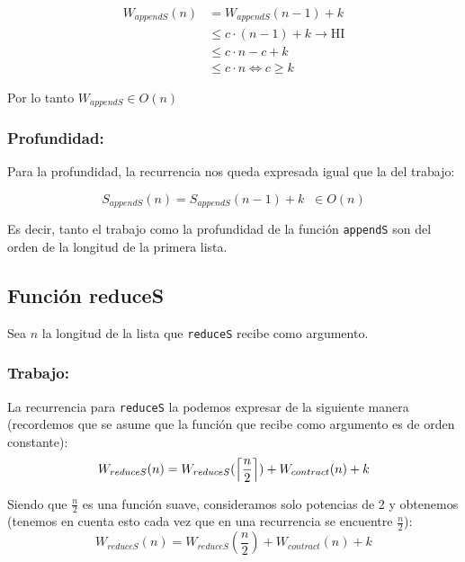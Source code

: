 \documentclass[11pt]{article}
\DeclarePairedDelimiter{\ceil}{\lceil}{\rceil}
\begin{document}
\begin{align*}
    W_{appendS}(n) & = W_{appendS}(n - 1) + k \\
             & \leq c \cdot (n - 1) + k \rightarrow \text{HI}\\
             & \leq c \cdot n - c + k \\
             & \leq c \cdot n \iff c \geq k
\end{align*}

Por lo tanto $W_{appendS} \in O(n)$ \\

\subsubsection{Profundidad:}

Para la profundidad, la recurrencia nos queda expresada igual que la del
trabajo:

\begin{equation*}
    S_{appendS}(n) = S_{appendS}(n - 1) + k \; \; \in O(n)
\end{equation*}

Es decir, tanto el trabajo como la profundidad de la función \texttt{appendS}
son del orden de la longitud de la primera lista.


\subsection{Función reduceS}
Sea $n$ la longitud de la lista que \texttt{reduceS} recibe como argumento.
\subsubsection{Trabajo:}

La recurrencia para \texttt{reduceS} la podemos expresar de la siguiente manera
(recordemos que se asume que la función que recibe como argumento es de orden constante):
\begin{equation*}
    W_{reduceS}(n) = W_{reduceS}(\ceil*{\frac{n}{2}}) + W_{contract}(n) + k
\end{equation*}

Siendo que $\frac{n}{2}$ es una función suave, consideramos solo potencias de 2
y obtenemos (tenemos en cuenta esto cada vez que en una recurrencia se encuentre
$\frac{n}{2}$):
\begin{equation*}
    W_{reduceS}(n) = W_{reduceS}(\frac{n}{2}) + W_{contract}(n) + k
\end{equation*}
\end{document}
